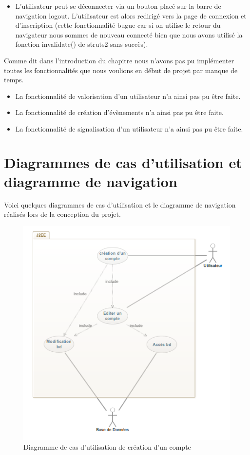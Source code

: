 \begin{itemize}
 \item L'utilisateur peut se déconnecter via un bouton placé sur la barre de navigation logout.
  L'utilisateur est alors redirigé vers la page de connexion et d'inscription (cette fonctionnalité bugue car si on utilise le retour du navigateur nous sommes de nouveau connecté bien que nous avons utilisé la fonction invalidate() de struts2 sans succès).
\end{itemize}

Comme dit dans l'introduction du chapitre nous n'avons pas pu implémenter toutes les fonctionnalités que nous voulions en début de projet par manque de temps.
\begin{itemize}
\item La fonctionnalité de valorisation d'un utilisateur n'a ainsi pas pu être faite.
\item La fonctionnalité de création d'évènements n'a ainsi pas pu être faite.
\item La fonctionnalité de signalisation d'un utilisateur n'a ainsi pas pu être faite.

\end{itemize}

\newpage
\section{Diagrammes de cas d'utilisation et diagramme de navigation}

Voici quelques diagrammes de cas d'utilisation et le diagramme de navigation réalisés lors de la conception du projet.
\vfill
\begin{figure}[ht!]
  \centering
   \caption{Diagramme de cas d'utilisation de création d'un compte}
   \includegraphics[scale=0.7]{cuCC}
\end{figure}

